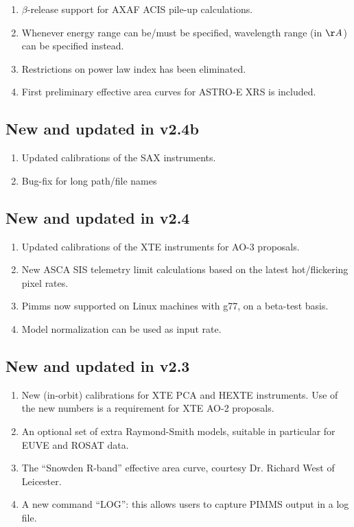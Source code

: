 \documentclass[11pt]{article}
\begin{document}
\begin{appendices}
\begin{enumerate}
\item $\beta$-release support for AXAF ACIS pile-up calculations.
\item Whenever energy range can be/must be specified, wavelength range
	(in $\AA$) can be specified instead.
\item Restrictions on power law index has been eliminated.
\item First preliminary effective area curves for ASTRO-E XRS is included.
\end{enumerate}

\subsection{New and updated in v2.4b}

\begin{enumerate}
\item Updated calibrations of the SAX instruments.
\item Bug-fix for long path/file names
\end{enumerate}

\subsection{New and updated in v2.4}

\begin{enumerate}
\item Updated calibrations of the XTE instruments for AO-3 proposals.
\item New ASCA SIS telemetry limit calculations based on the latest
hot/flickering pixel rates.
\item Pimms now supported on Linux machines with g77, on a beta-test basis.
\item Model normalization can be used as input rate.
\end{enumerate}

\subsection{New and updated in v2.3}

\begin{enumerate}
\item New (in-orbit) calibrations for XTE PCA
and HEXTE instruments.  Use of the new numbers is a requirement for XTE
AO-2 proposals.
\item An optional set of extra Raymond-Smith models, suitable in particular
for EUVE and ROSAT data.
\item The ``Snowden R-band'' effective area curve, courtesy Dr. Richard
West of Leicester.
\item A new command ``LOG'': this allows users to capture PIMMS output in
a log file.
\end{enumerate}

\end{appendices}
\end{document}

